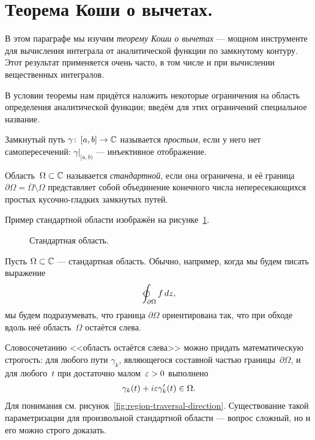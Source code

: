 \documentclass[../complex-analysis.tex]{subfiles}
\begin{document}
\newpage
\section{Теорема Коши о вычетах.}

В этом параграфе мы изучим \emph{теорему Коши о вычетах} --- мощном инструменте для вычисления интеграла от аналитической функции по замкнутому контуру. Этот результат применяется очень часто, в том числе и при вычислении вещественных интегралов.

В условии теоремы нам придётся наложить некоторые ограничения на область определения аналитической функции; введём для этих ограничений специальное название.

\begin{df}
 Замкнутый путь $ \gamma\colon\,[a,b] \to \mathbb{C} $ называется \textit{простым}, если у него нет самопересечений: $\gamma |_{[a,b)}$ --- инъективное отображение.
\end{df}

\begin{df}
 Область~$ \Omega \subset \mathbb{C} $ называется \emph{стандартной}, если она ограничена, и её граница $ \partial\Omega = \overline \Omega \setminus \Omega $ представляет собой объединение конечного числа непересекающихся простых кусочно-гладких замкнутых путей.
\end{df}

Пример стандартной области изображён на рисунке~\ref{fig:standart-region}.

\begin{figure}[ht]
 \centering
 \caption{Стандартная область.}
 \label{fig:standart-region}
\end{figure}

\begin{conventn}
 \label{convention:Standard Region Canonical Parameterization}
 Пусть $ \Omega \subset\mathbb{C}$ --- стандартная область. Обычно, например, когда мы будем писать выражение
 \begin{align*}
  \varointctrclockwise_{\partial \Omega} f \, dz,
 \end{align*} мы будем подразумевать, что граница $ \partial \Omega $ ориентирована так, что при обходе вдоль неё область~$ \Omega $ остаётся слева.

 Словосочетанию <<область остаётся слева>> можно придать математическую строгость: для любого пути $ \gamma_k $, являющегося составной частью границы~$ \partial\Omega $, и для любого~$ t $ при достаточно малом~$ \varepsilon > 0 $ выполнено
 \begin{align*}
  \gamma_k(t) + i\varepsilon\gamma_k'(t) \in \Omega.
 \end{align*} Для понимания см. рисунок~\ref{fig:region-traversal-direction}. Существование такой параметризации для произвольной стандартной области --- вопрос сложный, но и его можно строго доказать.
\end{conventn}
\end{document}
